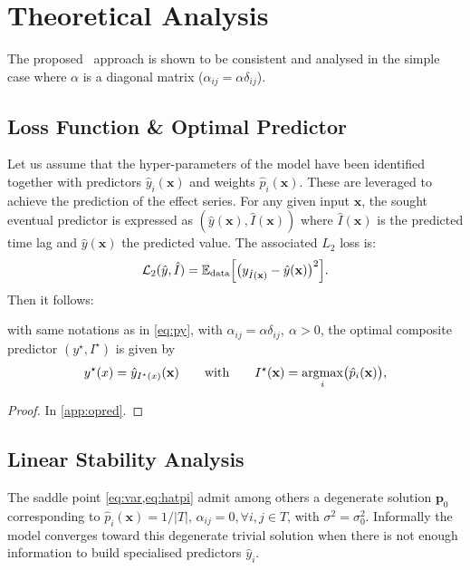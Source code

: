 \section{Theoretical Analysis}\label{sec:dtlrtheory}
The proposed \XX\ approach is shown to be consistent and analysed in the simple case where $\alpha$ 
is a diagonal matrix ($\alpha_{ij} = \alpha\delta_{ij}$).

\subsection{Loss Function \& Optimal Predictor}\label{sec:prop}
Let us assume that the hyper-parameters of the model have been identified 
together with predictors $\hat y_i(\mathbf{x})$ and weights $\hat p_i(\mathbf{x})$. 
These are leveraged to achieve the prediction of the effect series. For any 
given input $\mathbf{x}$, the sought eventual predictor is expressed as 
$(\hat y(\mathbf{x}),\hat I(\mathbf{x}))$ where $\hat I(\mathbf{x})$ is the 
predicted time lag and $\hat y(\mathbf{x})$ the predicted 
value. The associated $L_2$ loss is: 
%
\begin{equation}\label{eq:orloss}
  {\cal L}_2(\hat y,\hat I) = {\mathbb E}_{\rm data}\Bigl[\bigl(y_{\hat I(\mathbf{x})}-\hat y(\mathbf{x})\bigr)^2\Bigr]. 
\end{equation}
%
Then it follows:
%
\begin{prop}\label{prop:opred}
with same notations as in \cref{eq:py}, with $\alpha_{ij} = \alpha\delta_{ij},\ \alpha>0$, 
the optimal composite predictor $(y^\star,I^\star)$ is given by
\[
  y^\star(x) = 
    \hat y_{I^\star(x)}(\mathbf{x})\qquad\text{with}\qquad I^\star(\mathbf{x}) = \operatorname*{argmax}_{i} \bigl(\hat p_i(\mathbf{x})\bigr), 
\]
\end{prop}
%
\begin{proof}
In \cref{app:opred}.
\end{proof}

\subsection{Linear Stability Analysis}\label{sec:stability}
The saddle point \cref{eq:var,eq:hatpi} admit among others a degenerate solution 
$\mathbf{p}_0$ corresponding to $\hat p_i(\mathbf{x}) = 1/\vert T\vert$, 
$\alpha_{ij}=0, \forall i,j \in T$, with $\sigma^2 = \sigma_0^2$. Informally the model converges 
toward this degenerate trivial solution when there is not enough information to build specialised 
predictors $\hat y_i$. 

